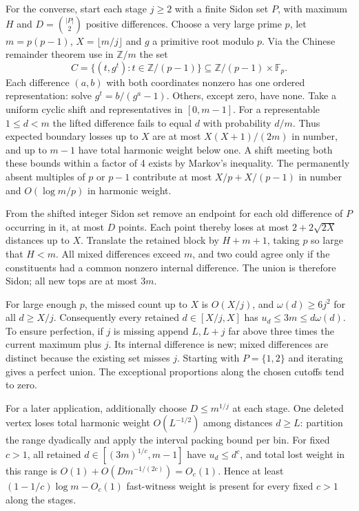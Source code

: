 \documentclass[10pt,a4paper]{article}
\begin{document}
For the converse, start each stage $j\ge2$ with a finite Sidon set $P$, with maximum $H$ and $D=\binom{|P|}{2}$ positive differences. Choose a very large prime $p$, let $m=p(p-1)$, $X=\lfloor m/j\rfloor$ and $g$ a primitive root modulo $p$. Via the Chinese remainder theorem use in $\mathbb Z/m$ the set
\[
 C=\{(t,g^t):t\in\mathbb Z/(p-1)\}\subseteq\mathbb Z/(p-1)\times\mathbb F_p.
\]
Each difference $(a,b)$ with both coordinates nonzero has one ordered representation: solve $g^t=b/(g^a-1)$. Others, except zero, have none. Take a uniform cyclic shift and representatives in $[0,m-1]$. For a representable $1\le d<m$ the lifted difference fails to equal $d$ with probability $d/m$. Thus expected boundary losses up to $X$ are at most $X(X+1)/(2m)$ in number, and up to $m-1$ have total harmonic weight below one. A shift meeting both these bounds within a factor of 4 exists by Markov's inequality. The permanently absent multiples of $p$ or $p-1$ contribute at most $X/p+X/(p-1)$ in number and $O(\log m/p)$ in harmonic weight.

From the shifted integer Sidon set remove an endpoint for each old difference of $P$ occurring in it, at most $D$ points. Each point thereby loses at most $2+2\sqrt{2X}$ distances up to $X$. Translate the retained block by $H+m+1$, taking $p$ so large that $H<m$. All mixed differences exceed $m$, and two could agree only if the constituents had a common nonzero internal difference. The union is therefore Sidon; all new tops are at most $3m$.

For large enough $p$, the missed count up to $X$ is $O(X/j)$, and $\omega(d)\ge6j^2$ for all $d\ge X/j$. Consequently every retained $d\in[X/j,X]$ has $u_d\le3m\le d\omega(d)$. To ensure perfection, if $j$ is missing append $L,L+j$ far above three times the current maximum plus $j$. Its internal difference is new; mixed differences are distinct because the existing set misses $j$. Starting with $P=\{1,2\}$ and iterating gives a perfect union. The exceptional proportions along the chosen cutoffs tend to zero.

For a later application, additionally choose $D\le m^{1/j}$ at each stage. One deleted vertex loses total harmonic weight $O(L^{-1/2})$ among distances $d\ge L$: partition the range dyadically and apply the interval packing bound per bin. For fixed $c>1$, all retained $d\in[(3m)^{1/c},m-1]$ have $u_d\le d^c$, and total lost weight in this range is $O(1)+O(Dm^{-1/(2c)})=O_c(1)$. Hence at least $(1-1/c)\log m-O_c(1)$ fast-witness weight is present for every fixed $c>1$ along the stages.
\end{document}
